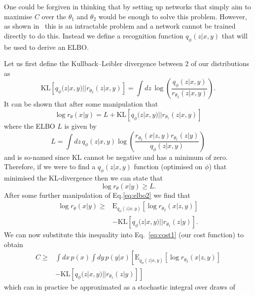 \documentclass[%
showpacs,
 amsmath,amssymb,
 aps,
 twocolumn,
 prl,
 reprint,
floatfix,
]{revtex4-1}
\begin{document}
One could be forgiven in thinking that by setting up networks that simply aim
to maximise $C$ over the $\theta_{1}$ and $\theta_{2}$ would be enough to solve
this problem. However, as shown in~\cite{NIPS2015_5775} this is an intractable
problem and a network cannot be trained directly to do this. Instead we define
a recognition function $q_{\phi}(z|x,y)$ that will be used to derive an
\ac{ELBO}.

Let us first define the Kullback–Leibler divergence between 2 of our
distributions as
%
\begin{equation}\label{eq:kl}
\text{KL}\left[q_{\phi}(z|x,y)||r_{\theta_{2}}(z|x,y)\right] = \int dz\,
\log\left(\frac{q_{\phi}(z|x,y)}{r_{\theta_{2}}(z|x,y)}\right).
\end{equation}
%  
It can be shown that after some manipulation that
%
\begin{equation}\label{eq:elbo1}
\log r_{\theta}(x|y) = L + \text{KL}\left[q_{\phi}(z|x,y)||r_{\theta_{?}}(z|x,y)\right]
\end{equation}
%
where the \ac{ELBO} $L$ is given by
%
\begin{equation}\label{eq:elbo2}
L = \int dz\,
q_{\phi}(z|x,y)\log\left(\frac{r_{\theta_{2}}(x|z,y)r_{\theta_{1}}(z|y)}{q_{\phi}(z|x,y)}\right)
\end{equation}
%
and is so-named since $\text{KL}$ cannot be negative and has a minimum of zero.
Therefore, if we were to find a $q_{\phi}(z|x,y)$ function (optimised on
$\phi$) that minimised the KL-divergence then we can state that
%
\begin{equation}
\log r_{\theta}(x|y) \geq L.
\end{equation}
%
After some further manipulation of Eq.\ref{eq:elbo2} we find that
%
\begin{align}\label{eq:logr}
\log r_{\theta}(x|y) \geq & \text{E}_{q_{\phi}(z|x,y)}\left[\log
r_{\theta_{2}}(x|z,y)\right] \nonumber\\
&-\text{KL}\left[q_{\phi}(z|x,y)||r_{\theta_{1}}(z|y)\right].
\end{align}
%
We can now substitute this inequality into Eq.~\ref{eq:cost1} (our cost
function) to obtain
%
\begin{align}\label{eq:cost2}
C \geq & \int dx\, p(x)\int dy\,p(y|x)
\left[\text{E}_{q_{\phi}(z|x,y)}\left[\log r_{\theta_{2}}(x|z,y)\right]
\right.\nonumber\\
&-\left.\text{KL}\left[q_{\phi}(z|x,y)||r_{\theta_{1}}(z|y)\right]\right]  
\end{align}
%
which can in practice be approximated as a stochastic integral over draws of
\end{document}
